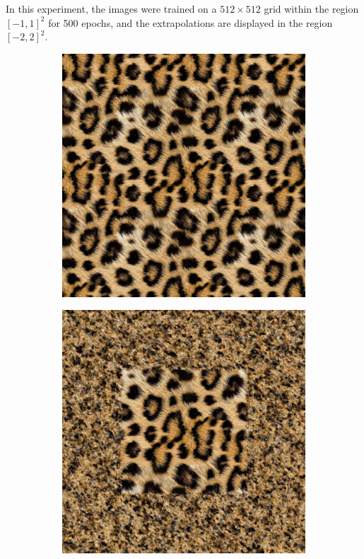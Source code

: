In this experiment, the images were trained on a $512 \times 512$ grid within the region $[-1, 1]^2$ for 500 epochs, and the extrapolations are displayed in the region $[-2, 2]^2$.


\begin{figure}[!ht]
    \centering
      \begin{subfigure}{0.24\textwidth}
        \includegraphics[width=\textwidth]{img/ch6/mnet_extrapolation.png}
        \caption{} \label{fig:comp-a}
      \end{subfigure}
      \begin{subfigure}{0.24\textwidth}
        \includegraphics[width=\textwidth]{img/ch6/siren_extrapolation.png}

\end{subfigure}
\end{figure}
